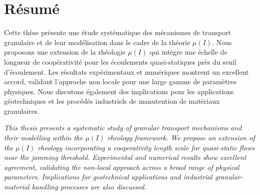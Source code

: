 \chapter*{R\'esum\'e}

\begin{abstractbox}
\noindent Cette th\`ese pr\'esente une \'etude syst\'ematique des m\'ecanismes de transport granulaire et de leur mod\'elisation dans le cadre de la th\'eorie $\mu(I)$. Nous proposons une extension de la rh\'eologie $\mu(I)$ qui int\`egre une \'echelle de longueur de coop\'erativit\'e pour les \'ecoulements quasi-statiques pr\`es du seuil d'\'ecoulement. Les r\'esultats exp\'erimentaux et num\'eriques montrent un excellent accord, validant l'approche non locale pour une large gamme de param\`etres physiques. Nous discutons \'egalement des implications pour les applications g\'eotechniques et les proc\'ed\'es industriels de manutention de mat\'eriaux granulaires.

\vspace{8pt}

\noindent
\textit{This thesis presents a systematic study of granular transport mechanisms and their modelling within the $\mu(I)$ rheology framework. We propose an extension of the $\mu(I)$ rheology incorporating a cooperativity length scale for quasi-static flows near the jamming threshold. Experimental and numerical results show excellent agreement, validating the non-local approach across a broad range of physical parameters. Implications for geotechnical applications and industrial granular-material handling processes are also discussed.}
\end{abstractbox}

\vspace{20pt}

